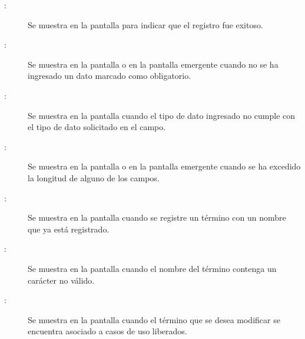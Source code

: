 \begin{description}
	\item[:] Se muestra en la pantalla  para indicar que el registro fue exitoso.
	\item[:] Se muestra en la pantalla  o en la pantalla emergente  cuando no se ha ingresado un dato marcado como obligatorio.
	\item[:] Se muestra en la pantalla  cuando el tipo de dato ingresado no cumple con el tipo de dato solicitado en el campo.
	\item[:] Se muestra en la pantalla  o en la pantalla emergente  cuando se ha excedido la longitud de alguno de los campos.
	\item[:] Se muestra en la pantalla  cuando se registre un término con un nombre que ya está registrado.
	\item[:] Se muestra en la pantalla  cuando el nombre del término contenga un carácter no válido.
	\item[:] Se muestra en la pantalla  cuando el término que se desea modificar se encuentra asociado a casos de uso liberados.			
\end{description}
